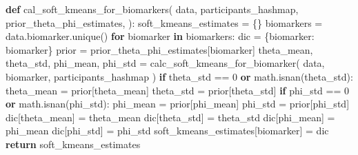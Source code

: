 \documentclass[
  letterpaper,
  DIV=11,
  numbers=noendperiod]{scrreprt}
\newenvironment{Shaded}{\begin{snugshade}}{\end{snugshade}}
\newcommand{\ControlFlowTok}[1]{\textcolor[rgb]{0.00,0.23,0.31}{\textbf{#1}}}
\newcommand{\DecValTok}[1]{\textcolor[rgb]{0.68,0.00,0.00}{#1}}
\newcommand{\KeywordTok}[1]{\textcolor[rgb]{0.00,0.23,0.31}{\textbf{#1}}}
\newcommand{\NormalTok}[1]{\textcolor[rgb]{0.00,0.23,0.31}{#1}}
\newcommand{\OperatorTok}[1]{\textcolor[rgb]{0.37,0.37,0.37}{#1}}
\newcommand{\StringTok}[1]{\textcolor[rgb]{0.13,0.47,0.30}{#1}}
\begin{document}
\begin{Shaded}
\begin{Highlighting}[]
\KeywordTok{def}\NormalTok{ cal\_soft\_kmeans\_for\_biomarkers(}
\NormalTok{        data,}
\NormalTok{        participants\_hashmap,}
\NormalTok{        prior\_theta\_phi\_estimates,}
\NormalTok{):}
\NormalTok{    soft\_kmeans\_estimates }\OperatorTok{=}\NormalTok{ \{\}}
\NormalTok{    biomarkers }\OperatorTok{=}\NormalTok{ data.biomarker.unique()}
    \ControlFlowTok{for}\NormalTok{ biomarker }\KeywordTok{in}\NormalTok{ biomarkers:}
\NormalTok{        dic }\OperatorTok{=}\NormalTok{ \{}\StringTok{\textquotesingle{}biomarker\textquotesingle{}}\NormalTok{: biomarker\}}
\NormalTok{        prior }\OperatorTok{=}\NormalTok{ prior\_theta\_phi\_estimates[biomarker]}
\NormalTok{        theta\_mean, theta\_std, phi\_mean, phi\_std }\OperatorTok{=}\NormalTok{ calc\_soft\_kmeans\_for\_biomarker(}
\NormalTok{            data, biomarker, participants\_hashmap}
\NormalTok{        )}
        \ControlFlowTok{if}\NormalTok{ theta\_std }\OperatorTok{==} \DecValTok{0} \KeywordTok{or}\NormalTok{ math.isnan(theta\_std):}
\NormalTok{            theta\_mean }\OperatorTok{=}\NormalTok{ prior[}\StringTok{\textquotesingle{}theta\_mean\textquotesingle{}}\NormalTok{]}
\NormalTok{            theta\_std }\OperatorTok{=}\NormalTok{ prior[}\StringTok{\textquotesingle{}theta\_std\textquotesingle{}}\NormalTok{]}
        \ControlFlowTok{if}\NormalTok{ phi\_std }\OperatorTok{==} \DecValTok{0} \KeywordTok{or}\NormalTok{ math.isnan(phi\_std):}
\NormalTok{            phi\_mean }\OperatorTok{=}\NormalTok{ prior[}\StringTok{\textquotesingle{}phi\_mean\textquotesingle{}}\NormalTok{]}
\NormalTok{            phi\_std }\OperatorTok{=}\NormalTok{ prior[}\StringTok{\textquotesingle{}phi\_std\textquotesingle{}}\NormalTok{]}
\NormalTok{        dic[}\StringTok{\textquotesingle{}theta\_mean\textquotesingle{}}\NormalTok{] }\OperatorTok{=}\NormalTok{ theta\_mean}
\NormalTok{        dic[}\StringTok{\textquotesingle{}theta\_std\textquotesingle{}}\NormalTok{] }\OperatorTok{=}\NormalTok{ theta\_std}
\NormalTok{        dic[}\StringTok{\textquotesingle{}phi\_mean\textquotesingle{}}\NormalTok{] }\OperatorTok{=}\NormalTok{ phi\_mean}
\NormalTok{        dic[}\StringTok{\textquotesingle{}phi\_std\textquotesingle{}}\NormalTok{] }\OperatorTok{=}\NormalTok{ phi\_std}
\NormalTok{        soft\_kmeans\_estimates[biomarker] }\OperatorTok{=}\NormalTok{ dic}
    \ControlFlowTok{return}\NormalTok{ soft\_kmeans\_estimates}
\end{Highlighting}
\end{Shaded}
\end{document}
